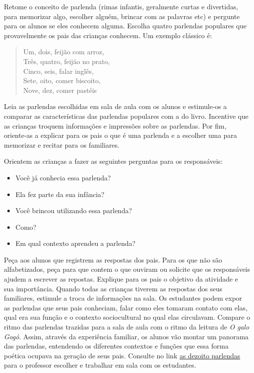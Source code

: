\documentclass[11pt]{extarticle}
\begin{document}
Retome o conceito de parlenda (rimas infantis, geralmente curtas e divertidas, para memorizar algo, escolher alguém, brincar com as palavras etc) e pergunte para os alunos se eles conhecem alguma. Escolha quatro parlendas populares que provavelmente os pais das crianças conhecem. Um exemplo clássico é:

\begin{verse}
Um, dois, feijão com arroz,\\
Três, quatro, feijão no prato,\\
Cinco, seis, falar inglês,\\
Sete, oito, comer biscoito,\\
Nove, dez, comer pastéis
\end{verse}

Leia as parlendas escolhidas em sala de aula com os alunos e estimule-os a comparar as características das parlendas populares com a do livro. Incentive que as crianças troquem informações e impressões sobre as parlendas. Por fim, oriente-as a explicar para os pais o que é uma parlenda e a escolher uma para memorizar e recitar para os familiares.

Orientem as crianças a fazer as seguintes perguntas para os responsáveis:

\begin{itemize}
\item Você já conhecia essa parlenda?

\item Ela fez parte da sua infância?

\item Você brincou utilizando essa parlenda?

\item Como?

\item Em qual contexto aprendeu a parlenda?
\end{itemize}

Peça aos alunos que registrem as respostas dos pais. Para os que não são alfabetizados, peça para que contem o que ouviram ou solicite que os responsáveis ajudem a escrever as repostas. Explique para os pais o objetivo da atividade e sua importância.
Quando todas as crianças tiverem as respostas dos seus familiares, estimule a troca de informações na sala. Os estudantes podem expor as parlendas que seus pais conheciam, falar como eles tomaram contato com elas, qual era sua função e o contexto sociocultural no qual elas circulavam. Compare o ritmo das parlendas trazidas para a sala de aula com o ritmo da leitura de \textit{O galo Gogó}. Assim, através da experiência familiar, os alunos vão montar um panorama das parlendas, entendendo os diferentes contextos e funções que essa forma poética ocupava na geração de seus pais.
Consulte no link \href{https://blog.ataba.com.br/parlendas/}{as dezoito parlendas} para o professor escolher e trabalhar em sala com os estudantes. 
\end{document}
